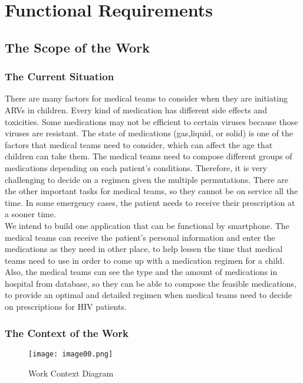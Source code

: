 \documentclass[12pt]{article}
\begin{document}
\section{Functional Requirements}
\setcounter{subsection}{6}
\subsection{The Scope of the Work}
\subsubsection{The Current Situation}
There are many factors for medical teams to consider when they are initiating ARVs in children. Every kind of medication has different side effects and toxicities. Some medications may not be efficient to certain viruses because those viruses are resistant. The state of medications (gas,liquid, or solid) is one of the factors that medical teams need to consider, which can affect the age that children can take them. The medical teams need to compose different groups of medications depending on each patient’s conditions. Therefore, it is very challenging to decide on a regimen given the multiple permutations. There are the other important tasks for medical teams, so they cannot be on service all the time. In some emergency cases, the patient needs to receive their prescription at a sooner time.
\\We intend to build one application that can be functional  by smartphone. The medical teams can receive the patient’s personal information and enter the medications as they need in other place, to help lessen the time that medical teams need to use in order to come up with a medication regimen for a child. Also, the medical teams can see the type and the amount of medications in hospital from database, so they can be able to compose the feasible medications, to provide an optimal and detailed regimen when medical teams need to decide on prescriptions for HIV patients.

\subsubsection{The Context of the Work}
\newpage
\vfill
\begin{figure}[ht]
  \texttt{[image: image00.png]}
  \caption{Work Context Diagram}
  \label{fig:Work Context Diagram}
\end{figure}
\vfill
\end{document}
